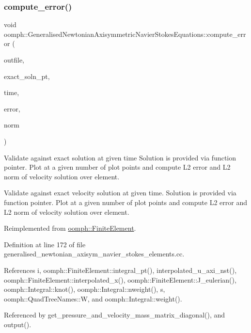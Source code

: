\subsubsection{\texorpdfstring{compute\+\_\+error()}{compute\_error()}\hspace{0.1cm}{\footnotesize\ttfamily [1/2]}}
{\footnotesize\ttfamily void oomph\+::\+Generalised\+Newtonian\+Axisymmetric\+Navier\+Stokes\+Equations\+::compute\+\_\+error (\begin{DoxyParamCaption}\item[{std\+::ostream \&}]{outfile,  }\item[{\hyperlink{classoomph_1_1FiniteElement_ad4ecf2b61b158a4b4d351a60d23c633e}{Finite\+Element\+::\+Unsteady\+Exact\+Solution\+Fct\+Pt}}]{exact\+\_\+soln\+\_\+pt,  }\item[{const double \&}]{time,  }\item[{double \&}]{error,  }\item[{double \&}]{norm }\end{DoxyParamCaption})\hspace{0.3cm}{\ttfamily [virtual]}}



Validate against exact solution at given time Solution is provided via function pointer. Plot at a given number of plot points and compute L2 error and L2 norm of velocity solution over element. 

Validate against exact velocity solution at given time. Solution is provided via function pointer. Plot at a given number of plot points and compute L2 error and L2 norm of velocity solution over element. 

Reimplemented from \hyperlink{classoomph_1_1FiniteElement_a7f67853506dc73fa6b7505108de22d1f}{oomph\+::\+Finite\+Element}.



Definition at line 172 of file generalised\+\_\+newtonian\+\_\+axisym\+\_\+navier\+\_\+stokes\+\_\+elements.\+cc.



References i, oomph\+::\+Finite\+Element\+::integral\+\_\+pt(), interpolated\+\_\+u\+\_\+axi\+\_\+nst(), oomph\+::\+Finite\+Element\+::interpolated\+\_\+x(), oomph\+::\+Finite\+Element\+::\+J\+\_\+eulerian(), oomph\+::\+Integral\+::knot(), oomph\+::\+Integral\+::nweight(), s, oomph\+::\+Quad\+Tree\+Names\+::W, and oomph\+::\+Integral\+::weight().



Referenced by get\+\_\+pressure\+\_\+and\+\_\+velocity\+\_\+mass\+\_\+matrix\+\_\+diagonal(), and output().

